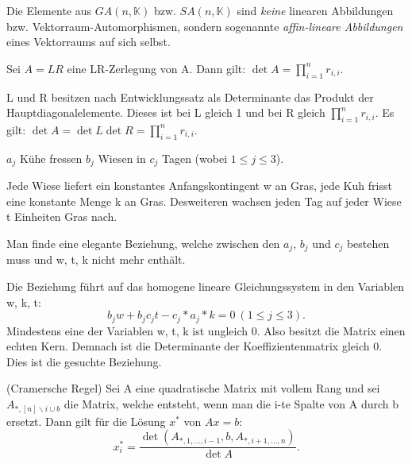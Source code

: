 \documentclass[10pt]{scrbook}
\begin{document}
\begin{Bem}
Die Elemente aus $GA(n, \mathbb{K})$ bzw. $SA(n, \mathbb{K})$ sind \emph{keine} linearen Abbildungen bzw. Vektorraum-Automorphismen, sondern sogenannte \emph{affin-lineare Abbildungen} eines Vektorraums auf sich selbst.
\end{Bem}

\begin{Sa}
Sei $A=L R$ eine LR-Zerlegung von A. Dann gilt: $\det A=\prod_{i=1}^n r_{i, i}$.
\end{Sa}
\begin{bew}
L und R besitzen nach Entwicklungssatz als Determinante das Produkt der Hauptdiagonalelemente. Dieses ist bei L gleich 1 und bei R gleich $\prod_{i=1}^n r_{i, i}$. Es gilt: $\det A=\det L \det R= \prod_{i=1}^n r_{i, i}$.
\end{bew}

\begin{Auf}
$a_j$ Kühe fressen $b_j$ Wiesen in $c_j$ Tagen (wobei $1\leq j\leq 3$).

Jede Wiese liefert ein konstantes Anfangskontingent w an Gras, jede Kuh frisst eine konstante Menge k an Gras. Desweiteren wachsen jeden Tag auf jeder Wiese t Einheiten Gras nach.

Man finde eine elegante Beziehung, welche zwischen den $a_j$, $b_j$ und $c_j$ bestehen muss und w, t, k nicht mehr enthält.
\end{Auf}
\begin{Loe}
Die Beziehung führt auf das homogene lineare Gleichungssystem in den Variablen w, k, t:
\begin{displaymath}
	b_j w + b_j c_j t - c_j * a_j * k = 0\ (1\leq j\leq 3).
\end{displaymath}
Mindestens eine der Variablen w, t, k ist ungleich 0. Also besitzt die Matrix einen echten Kern. Demnach ist die Determinante der Koeffizientenmatrix gleich 0. Dies ist die gesuchte Beziehung.
\end{Loe}

\begin{Sa} (Cramersche Regel)
Sei A eine quadratische Matrix mit vollem Rang und sei $A_{*, [n]\backslash i\cup b}$ die Matrix, welche entsteht, wenn man die i-te Spalte von A durch b ersetzt. Dann gilt für die Lösung $x^*$ von $A x=b$:
\begin{displaymath}
	x^*_i=\frac{\det (A_{*, 1, \ldots, i-1},b, A_{*, i+1, \ldots, n})}{\det A}.
\end{displaymath}
\end{Sa}
\end{document}
